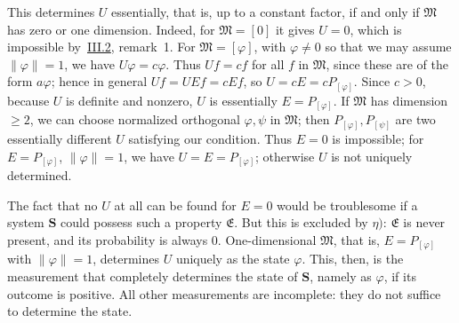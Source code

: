 \documentclass[fontsize=13pt,twoside,openany,headings=normal,parskip=false,bookmarkpackage=false,DIV=calc]{scrbook}
\begin{document}
This determines $U$ essentially, that is, up to a constant factor, if and only if $\mathfrak M$ has zero or one dimension. Indeed, for $\mathfrak M=[0]$ it gives $U=0$, which is impossible by~\hyperref[sec:III.2]{III.2}, remark~1. For $\mathfrak M=[\varphi]$, with $\varphi\ne0$ so that we may assume $\|\varphi\|=1$, we have $U\varphi=c\varphi$. Thus $Uf=cf$ for all $f$ in $\mathfrak M$, since these are of the form $a\varphi$; hence in general $Uf=UEf=cEf$, so $U=cE=cP_{[\varphi]}$. Since $c>0$, because $U$ is definite and nonzero, $U$ is essentially $E=P_{[\varphi]}$. If $\mathfrak M$ has dimension $\geq2$, we can choose normalized orthogonal $\varphi,\psi$ in $\mathfrak M$; then $P_{[\varphi]},P_{[\psi]}$ are two essentially different $U$ satisfying our condition. Thus $E=0$ is impossible; for $E=P_{[\varphi]}$, $\|\varphi\|=1$, we have $U=E=P_{[\varphi]}$; otherwise $U$ is not uniquely determined.

The fact that no $U$ at all can be found for $E=0$ would be troublesome if a system $\boldsymbol{S}$ could possess such a property $\mathfrak E$. But this is excluded by \hyperref[post:III.5.eta]{$\eta)$}: $\mathfrak E$ is never present, and its probability is always $0$. One-dimensional $\mathfrak M$, that is, $E=P_{[\varphi]}$ with $\|\varphi\|=1$, determines $U$ uniquely as the state $\varphi$. This, then, is the measurement that completely determines the state of $\boldsymbol{S}$, namely as $\varphi$, if its outcome is positive. All other measurements are incomplete: they do not suffice to determine the state.
\end{document}
